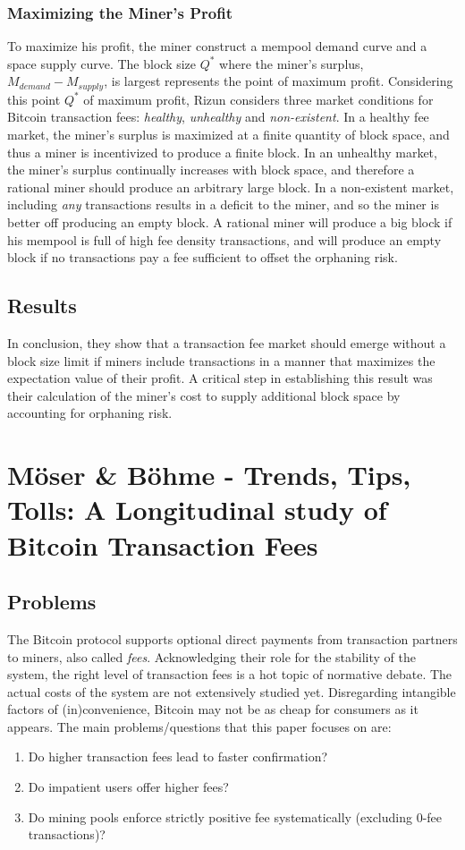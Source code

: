\documentclass[USenglish]{uit-thesis}
\begin{document}
\subsubsection{Maximizing the Miner's Profit}
To maximize his profit, the miner construct a mempool
demand curve and a space supply curve.
The block size $Q^*$ where the miner's surplus,
$M_{demand} - M_{supply}$, is largest represents
the point of maximum profit. Considering this point $Q^*$ of maximum
profit, Rizun considers three market conditions for Bitcoin transaction
fees: \emph{healthy}, \emph{unhealthy} and \emph{non-existent}.
In a healthy fee market, the miner's surplus is maximized
at a finite quantity of block space, and thus a miner is
incentivized to produce a finite block. In an unhealthy
market, the miner's surplus continually increases with
block space, and therefore a rational miner should produce
an arbitrary large block. In a non-existent market,
including \emph{any} transactions results in a deficit
to the miner, and so the miner is better off
producing an empty block. A rational
miner will produce a big block if his mempool
is full of high fee density transactions, and
will produce an empty block if no transactions pay a fee sufficient
to offset the orphaning risk.

\subsection{Results}
In conclusion, they show that a transaction fee market should
emerge without a block size limit if miners
include transactions in a manner that maximizes
the expectation value of their profit. A
critical step in establishing this result was their
calculation of the miner’s cost to supply
additional block space by accounting for orphaning risk.

\section{Möser \& Böhme - Trends, Tips, Tolls: A Longitudinal
study of Bitcoin Transaction Fees}
\label{sec:moser}
\subsection{Problems}
The Bitcoin protocol supports optional direct payments
from transaction partners to miners, also called \emph{fees}.
Acknowledging their
role for the stability of the system, the right level of
transaction fees is a hot topic of normative debate. The actual
costs of the system are not extensively studied yet. Disregarding
intangible factors of (in)convenience, Bitcoin may not be as cheap for
consumers as it appears. The main problems/questions
that this paper focuses on are:
\begin{enumerate}[noitemsep]
	\item Do higher transaction fees lead to faster confirmation?
	\item Do impatient users offer higher fees?
	\item Do mining pools enforce strictly positive fee systematically
	(excluding $0$-fee transactions)?
\end{enumerate}
\end{document}
